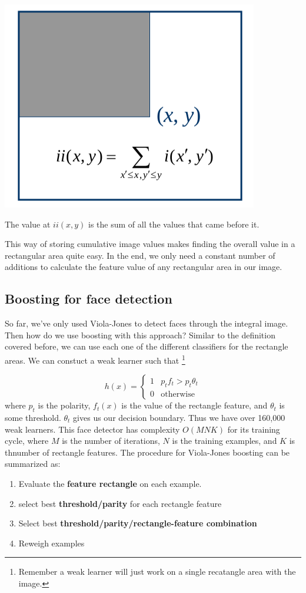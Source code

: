 \documentclass{tufte-handout}
\begin{document}
\begin{marginfigure}
		\includegraphics[scale=0.3]{integral}
		\caption{The value at $ii(x, y)$ is the sum of all the values that came before it.}
\end{marginfigure}

This way of storing cumulative image values makes finding the overall value in a rectangular area quite easy. 
In the end, we only need a constant number of additions to calculate the feature value of any rectangular 
area in our image.

\subsection{Boosting for face detection}
So far, we've only used Viola-Jones to detect faces through the integral image. Then how do we use boosting
with this approach? Similar to the definition covered before, we can use each one of the different classifiers
for the rectangle areas. We can constuct a weak learner such that \footnote{Remember a weak learner will just
work on a single recatangle area with the image.}

\[h(x) =  
	\begin{cases}
			1 & p_{t}f_{t} > p_{t}\theta_{t} \\
			0 & \textrm{otherwise}
	\end{cases}
\]
where $p_{t}$ is the polarity, $f_{t}(x)$ is the value of the rectangle feature, and $\theta_{t}$ is some
threshold. $\theta_{t}$ gives us our decision boundary. Thus we have over 160,000 weak learners.
This face detector has complexity $O(MNK)$ for its training cycle, where $M$ is the number of iterations,
$N$ is the training examples, and $K$ is thnumber of rectangle features.
The procedure for Viola-Jones boosting can be summarized as:
\begin{enumerate}	
	\item Evaluate the \textbf{feature rectangle} on each example.
	\item select best \textbf{threshold/parity} for each rectangle feature
	\item Select best \textbf{threshold/parity/rectangle-feature combination}
	\item Reweigh examples
\end{enumerate}
\end{document}

